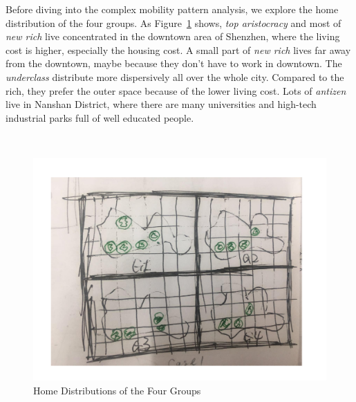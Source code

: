 Before diving into the complex mobility pattern analysis, we explore the home distribution of the four groups. As Figure~\ref{case1draft} shows, \textit{top aristocracy} and most of \textit{new rich} live concentrated in the downtown area of Shenzhen, where the living cost is higher, especially the housing cost. A small part of \textit{new rich} lives far away from the downtown, maybe because they don't have to work in downtown. The \textit{underclass} distribute more dispersively all over the whole city. Compared to the rich, they prefer the outer space because of the lower living cost. Lots of \textit{antizen} live in Nanshan District, where there are many universities and high-tech industrial parks full of well educated people.

\\

\begin{figure}[htb!]
 \centering %
 \includegraphics[width=\columnwidth]{pictures/case1draft}
 \caption{Home Distributions of the Four Groups}
 \label{case1draft}
\end{figure}

